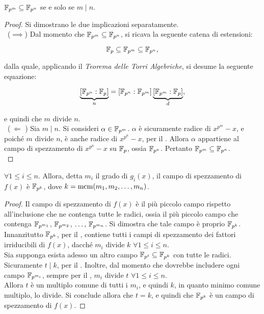 \documentclass[11pt]{scrbook}
\begin{document}
\begin{theorem}
    \label{th:inclusione}
    $\mathbb{F}_{p^m} \subseteq \mathbb{F}_{p^n}$ se e solo se $m \mid n$.
\end{theorem}

\begin{proof}
    Si dimostrano le due implicazioni separatamente. \\

    \ ($\implies$)\; Dal momento che $\mathbb{F}_{p^m} \subseteq \mathbb{F}_{p^n}$,
    si ricava la seguente catena di estensioni:

    \[ \mathbb{F}_p \subseteq \mathbb{F}_{p^m} \subseteq \mathbb{F}_{p^n}, \]

    \vskip 0.1in

    dalla quale, applicando il \textit{Teorema delle Torri Algebriche},
    si desume la seguente equazione:

    \[ \underbrace{[\mathbb{F}_{p^n} : \mathbb{F}_p]}_n = [\mathbb{F}_{p^n} : \mathbb{F}_{p^m}] \underbrace{[\mathbb{F}_{p^m} : \mathbb{F}_p]}_d, \]

    e quindi che $m$ divide $n$. \\

    \ ($\,\Longleftarrow\,\,$)\; Sia $m \mid n$. Si consideri $\alpha \in \mathbb{F}_{p^m}$. $\alpha$
    è sicuramente radice di $x^{p^m}-x$, e poiché $m$ divide $n$, è
    anche radice di $x^{p^n}-x$, per il . Allora
    $\alpha$ appartiene al campo di spezzamento di $x^{p^n}-x$ su $\mathbb{F}_p$,
    ossia $\mathbb{F}_{p^n}$. Pertanto $\mathbb{F}_{p^m} \subseteq \mathbb{F}_{p^n}$. \\
\end{proof}

\begin{corollary}
    $\forall 1 \leq i \leq n$. Allora, detta $m_i$ il grado di $g_i(x)$, il
    campo di spezzamento di $f(x)$ è $\mathbb{F}_{p^{k}}$, dove $k = \operatorname{mcm}(m_1, m_2, \ldots, m_n)$.
\end{corollary}

\begin{proof}
    Il campo di spezzamento di $f(x)$ è il più piccolo campo rispetto all'inclusione
    che ne contenga tutte le radici, ossia il più piccolo campo che contenga
    $\mathbb{F}_{p^{m_1}}$, $\mathbb{F}_{p^{m_2}}$, $\ldots,\, \mathbb{F}_{p^{m_n}}$. Si dimostra che tale campo
    è proprio $\mathbb{F}_{p^{k}}$. \\

    Innanzitutto $\mathbb{F}_{p^{k}}$, per il , contiene tutti i campi di spezzamento dei fattori irriducibili di $f(x)$, dacché $m_i$ divide $k$ $\forall 1 \leq i \leq n$. \\

    Sia supponga esista adesso un altro campo $\mathbb{F}_{p^{t}} \subseteq \mathbb{F}_{p^{k}}$ con tutte le
    radici. Sicuramente $t \mid k$, per il . Inoltre, dal momento
    che dovrebbe includere ogni campo $\mathbb{F}_{p^{m_i}}$, sempre per il ,
    $m_i$ divide $t$ $\forall 1 \leq i \leq n$. \\

    Allora $t$ è un multiplo comune di tutti i $m_i$, e quindi $k$, in quanto minimo
    comune multiplo, lo divide. Si conclude allora che $t = k$, e quindi che
    $\mathbb{F}_{p^{k}}$ è un campo di spezzamento di $f(x)$.
\end{proof}
\end{document}
